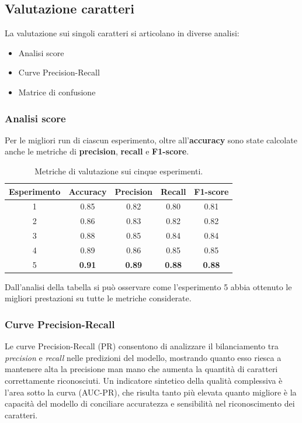 \subsection{Valutazione caratteri}
La valutazione sui singoli caratteri si articolano in diverse analisi:
\begin{itemize}
    \item Analisi score
    \item Curve Precision-Recall
    \item Matrice di confusione
\end{itemize}

\subsubsection*{Analisi score}
Per le migliori run di ciascun esperimento, oltre all'\textbf{accuracy} sono state calcolate anche le metriche di \textbf{precision}, \textbf{recall} e \textbf{F1-score}.

\begin{table}[H]
\centering
\begin{tabular}{c|c|c|c|c}
\textbf{Esperimento} & \textbf{Accuracy} & \textbf{Precision} & \textbf{Recall} & \textbf{F1-score} \\
\hline
1 & 0.85 & 0.82 & 0.80 & 0.81 \\
2 & 0.86 & 0.83 & 0.82 & 0.82 \\
3 & 0.88 & 0.85 & 0.84 & 0.84 \\
4 & 0.89 & 0.86 & 0.85 & 0.85 \\
5 & \textbf{0.91} & \textbf{0.89} & \textbf{0.88} & \textbf{0.88} \\
\end{tabular}
\caption{Metriche di valutazione sui cinque esperimenti.}
\label{tab:score_analysis}
\end{table}

Dall'analisi della tabella si può osservare come l'esperimento 5 abbia ottenuto le migliori prestazioni su tutte le metriche considerate.

\subsubsection*{Curve Precision-Recall}
\label{sec:pr_curves}
Le curve Precision-Recall (PR) consentono di analizzare il bilanciamento tra \emph{precision} e \emph{recall} nelle predizioni del modello, mostrando quanto esso riesca a mantenere alta la precisione man mano che aumenta la quantità di caratteri correttamente riconosciuti. Un indicatore sintetico della qualità complessiva è l'area sotto la curva (AUC-PR), che risulta tanto più elevata quanto migliore è la capacità del modello di conciliare accuratezza e sensibilità nel riconoscimento dei caratteri.

